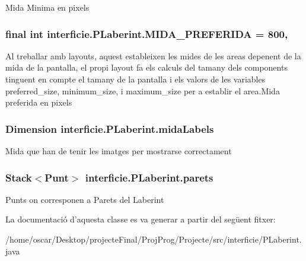 Mida Minima en pixels \hypertarget{classinterficie_1_1_p_laberint_a786f8eccff9163e74309c502243d4230}{
\subsubsection[{M\+I\+D\+A\+\_\+\+P\+R\+E\+F\+E\+R\+I\+D\+A}]{\setlength{\rightskip}{0pt plus 5cm}final int interficie.\+P\+Laberint.\+M\+I\+D\+A\+\_\+\+P\+R\+E\+F\+E\+R\+I\+D\+A = 800\hspace{0.3cm}{\ttfamily [static]}, {\ttfamily [private]}}}\label{classinterficie_1_1_p_laberint_a786f8eccff9163e74309c502243d4230}
Al treballar amb layouts, aquest estableixen les mides de les areas depenent de la mida de la pantalla, el propi layout fa els calculs del tamany dels components tinguent en compte el tamany de la pantalla i els valors de les variables preferred\+\_\+size, minimum\+\_\+size, i maximum\+\_\+size per a establir el area.\+Mida preferida en pixels \hypertarget{classinterficie_1_1_p_laberint_a9e8ee2e2a3fbf095be55f50f9d430e15}{
\subsubsection[{mida\+Labels}]{\setlength{\rightskip}{0pt plus 5cm}Dimension interficie.\+P\+Laberint.\+mida\+Labels\hspace{0.3cm}{\ttfamily [private]}}}\label{classinterficie_1_1_p_laberint_a9e8ee2e2a3fbf095be55f50f9d430e15}
Mida que han de tenir les imatges per mostrarse correctament \hypertarget{classinterficie_1_1_p_laberint_a45a890d19dc7c46a3437444e48cede0d}{
\subsubsection[{parets}]{\setlength{\rightskip}{0pt plus 5cm}Stack$<${\bf Punt}$>$ interficie.\+P\+Laberint.\+parets\hspace{0.3cm}{\ttfamily [private]}}}\label{classinterficie_1_1_p_laberint_a45a890d19dc7c46a3437444e48cede0d}
Punts on corresponen a Parets del Laberint 

La documentació d'aquesta classe es va generar a partir del següent fitxer\+:\begin{DoxyCompactItemize}
\item 
/home/oscar/\+Desktop/projecte\+Final/\+Proj\+Prog/\+Projecte/src/interficie/P\+Laberint.\+java\end{DoxyCompactItemize}
